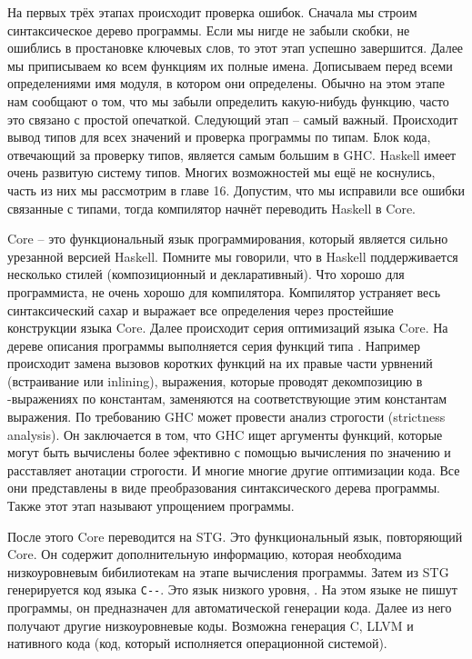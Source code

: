 На первых трёх этапах происходит проверка ошибок. 
Сначала мы строим синтаксическое дерево программы. 
Если мы нигде не забыли скобки, не ошиблись в простановке 
ключевых слов, то этот этап успешно завершится. 
Далее мы приписываем ко всем функциям их полные имена.
Дописываем перед всеми определениями имя модуля, в котором они
определены. Обычно на этом этапе нам сообщают о том, что
мы забыли определить какую-нибудь функцию, часто это связано
с простой опечаткой. Следующий этап -- самый важный. 
Происходит вывод типов для всех значений и проверка
программы по типам. Блок кода, отвечающий за проверку типов,
является самым большим в GHC. Haskell имеет очень 
развитую систему типов. Многих возможностей мы ещё 
не коснулись, часть из них мы рассмотрим в главе 16.
Допустим, что мы исправили все ошибки связанные с типами,
тогда компилятор начнёт переводить Haskell в Core.

Core -- это функциональный язык программирования, который 
является сильно урезанной версией Haskell. Помните мы говорили, что 
в Haskell поддерживается несколько стилей (композиционный
и декларативный). Что хорошо для программиста, не очень хорошо 
для компилятора. Компилятор устраняет весь синтаксический сахар
и выражает все определения через простейшие конструкции языка Core.
Далее происходит серия оптимизаций языка Core. На дереве
описания программы выполняется серия функций типа  \mbox{}.
Например происходит замена вызовов коротких функций на 
их правые части урвнений (встраивание или inlining), 
выражения, которые проводят декомпозицию в -выражениях 
по константам, заменяются на соответствующие этим константам 
выражения. По требованию GHC может провести анализ строгости
(strictness analysis). Он заключается в том, что GHC
ищет аргументы функций, которые могут быть вычислены 
более эфективно с помощью вычисления по значению и
расставляет анотации строгости. И многие многие другие
оптимизации кода. Все они представлены в виде преобразования
синтаксического дерева программы. Также этот этап называют
упрощением программы. 

После этого Core переводится на STG. Это функциональный
язык, повторяющий Core. Он содержит дополнительную информацию,
которая необходима низкоуровневым бибилиотекам на этапе 
вычисления программы. Затем из STG генерируется код
языка \verb!C--!. Это язык низкого уровня, .
На этом языке не пишут программы, он предназначен для 
автоматической генерации кода. Далее из него получают
другие низкоуровневые коды. Возможна генерация C, LLVM
и нативного кода (код, который исполняется операционной системой). 

